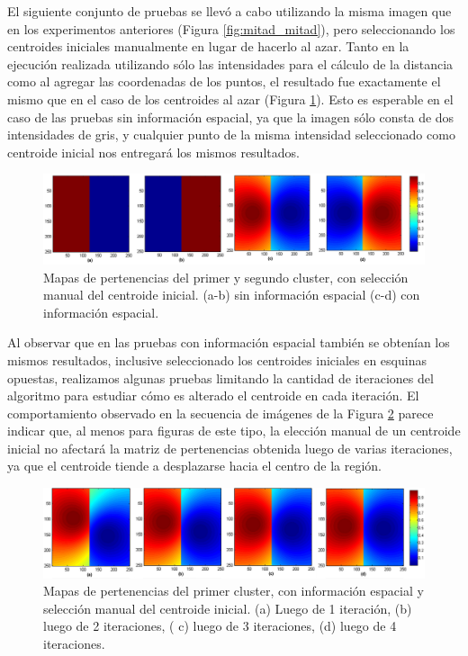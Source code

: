 El siguiente conjunto de pruebas se llevó a cabo utilizando la misma imagen que en los experimentos anteriores (Figura \ref{fig:mitad_mitad}), pero seleccionando los centroides iniciales manualmente en lugar de hacerlo al azar. Tanto en la ejecución realizada utilizando sólo las intensidades para el cálculo de la distancia como al agregar las coordenadas de los puntos, el resultado fue exactamente el mismo que en el caso de los centroides al azar (Figura \ref{fig:ejecucion_mitad_mitad_centroides_manuales}). Esto es esperable en el caso de las pruebas sin información espacial, ya que la imagen sólo consta de dos intensidades de gris, y cualquier punto de la misma intensidad seleccionado como centroide inicial nos entregará los mismos resultados.

\begin{figure}[H]
\centering
\includegraphics[scale=0.08]{images/mitad_mitad_001.jpg}
\caption{Mapas de pertenencias del primer y segundo cluster, con selección manual del centroide inicial. (a-b) sin información espacial (c-d) con información espacial.}
\label{fig:ejecucion_mitad_mitad_centroides_manuales}
\end{figure}

Al observar que en las pruebas con información espacial también se obtenían los mismos resultados, inclusive  seleccionado los centroides iniciales en esquinas opuestas, realizamos algunas pruebas limitando la cantidad de iteraciones del algoritmo para estudiar cómo es alterado el centroide en cada iteración. El comportamiento observado en la secuencia de imágenes de la Figura \ref{fig:ejecucion_mitad_mitad_iteraciones} parece indicar que, al menos para figuras de este tipo, la elección manual de un centroide inicial no afectará la matriz de pertenencias obtenida luego de varias iteraciones, ya que el centroide tiende a desplazarse hacia el centro de la región.

\begin{figure}[H]
\centering
\includegraphics[scale=0.08]{images/mitad_mitad_iteracion_x1.jpg}
\caption{Mapas de pertenencias del primer cluster, con información espacial y selección manual del centroide inicial. (a) Luego de 1 iteración, (b) luego de 2 iteraciones, ( c) luego de 3 iteraciones, (d) luego de 4 iteraciones.}
\label{fig:ejecucion_mitad_mitad_iteraciones}
\end{figure}

